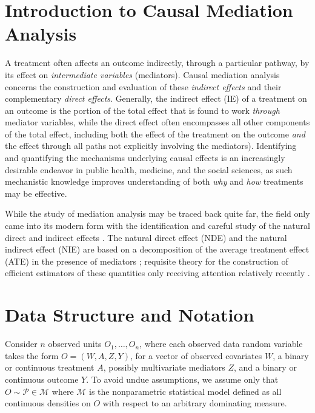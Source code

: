 \documentclass[12pt, krantz2,]{krantz}
\theoremstyle{definition}
\theoremstyle{definition}
\theoremstyle{definition}
\newcommand{\M}{\mathcal{M}}
\newcommand{\1}{\mathbbm{1}}
\begin{document}
\hypertarget{introduction-to-causal-mediation-analysis}{%
\section{Introduction to Causal Mediation Analysis}\label{introduction-to-causal-mediation-analysis}}

A treatment often affects an outcome indirectly, through a particular pathway,
by its effect on \emph{intermediate variables} (mediators). Causal mediation analysis
concerns the construction and evaluation of these \emph{indirect effects} and their
complementary \emph{direct effects}. Generally, the indirect effect (IE) of a
treatment on an outcome is the portion of the total effect that is found to work
\emph{through} mediator variables, while the direct effect often encompasses all
other components of the total effect, including both the effect of the treatment
on the outcome \emph{and} the effect through all paths not explicitly involving the
mediators). Identifying and quantifying the mechanisms underlying causal effects
is an increasingly desirable endeavor in public health, medicine, and the social
sciences, as such mechanistic knowledge improves understanding of both \emph{why} and
\emph{how} treatments may be effective.

While the study of mediation analysis may be traced back quite far, the field
only came into its modern form with the identification and careful study of the
natural direct and indirect effects \citep{robins1992identifiability, pearl2001direct}. The natural direct effect (NDE) and the natural indirect
effect (NIE) are based on a decomposition of the average treatment effect (ATE)
in the presence of mediators \citep{vanderweele2015explanation}; requisite
theory for the construction of efficient estimators of these quantities only
receiving attention relatively recently \citep{tchetgen2012semiparametric}.

\hypertarget{data-structure-and-notation-2}{%
\section{Data Structure and Notation}\label{data-structure-and-notation-2}}

Consider \(n\) observed units \(O_1, \ldots, O_n\), where each observed data random
variable takes the form \(O = (W, A, Z, Y)\), for a vector of observed covariates
\(W\), a binary or continuous treatment \(A\), possibly multivariate mediators \(Z\),
and a binary or continuous outcome \(Y\). To avoid undue assumptions, we assume
only that \(O \sim \mathcal{P} \in \M\) where \(\M\) is the nonparametric
statistical model defined as all continuous densities on \(O\) with respect to an
arbitrary dominating measure.
\end{document}
